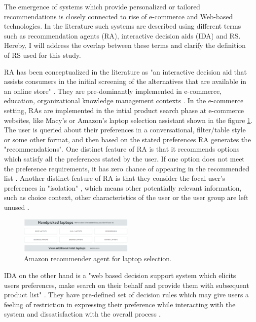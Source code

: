 \documentclass[a4paper,12pt]{article}
\begin{document}
The emergence of systems which provide personalized or tailored recommendations is closely connected to rise of e-commerce and Web-based technologies. In the literature such systems are described using different terms such as recommendation agents (RA), interactive decision aids (IDA) and RS. Hereby, I will address the overlap between these terms and clarify the definition of RS used for this study.

RA has been conceptualized in the literature as "an interactive decision aid that assists consumers in the initial screening of the alternatives that are available in 
an online store" \citep{haubl2000consumer, xiao2007commerce}. They are pre-dominantly implemented in e-commerce, education, organizational knowledge management contexts \citep{xiao2007commerce}. In the e-commerce setting,  RAs are implemented in the intial product search phase at e-commerce websites, like Macy's or Amazon's laptop selection assistant shown in the figure \ref{fig:amazonRA}. The user is queried about their preferences in a conversational, filter/table style or some other  format, and then based on the stated preferences RA generates the "recommendations". One distinct feature of RA is that it recommends options which satisfy all the preferences stated by the user. If one option does not meet the preference requirements, it has zero chance of appearing in the recommended list \citep{haubl2000consumer}. Another distinct feature of RA is that they consider the focal user's preferences in "isolation" , which means other potentially relevant information, such as choice context, other characteristics of the user or the user group are left unused \citep{wang2008attributions}.

\begin{figure}[H]
    \centering
    \includegraphics[width=0.5\textwidth]{staticFiles/amazonLaptopHandpicked.PNG}
    \caption{Amazon recommender agent for laptop selection.}
    \label{fig:amazonRA}
\end{figure}

IDA on the other hand is a "web based decision support system which elicits users preferences, make search on their behalf and provide them with subsequent product list" \citep{maes1999agents}. They have pre-defined set of decision rules which may give users a feeling of restriction in expressing their preference while interacting with the system and dissatisfaction with the overall process \citep{wang2009interactive, silver1988user}.
\end{document}
